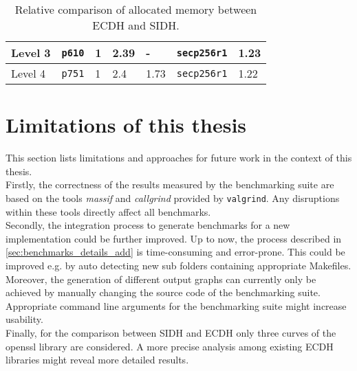 \begin{table}[H]
\begin{tabular}{|K{1.8cm}|K{1.8cm}|K{1.8cm}|K{2cm}|K{1.8cm}|K{1.8cm}|K{1.8cm}|}
{}Level 3                                                                                                                                                 & {}\texttt{p610}                                                                    & {}1 & 2.39                                                                                                         & -               & {}\texttt{secp256r1}                                                               & 1.23               \\ 
\hline
{}Level 4                                                                                                                                                 & {}\texttt{p751}                                                                    & {}1 & 2.4                                                                                                          & 1.73            & {}\texttt{secp256r1}                                                               & 1.22               \\
\hline
\end{tabular}
\caption[Comparing allocated memory between \gls{ECDH} and \gls{SIDH}]{Relative comparison of allocated memory between \gls{ECDH} and \gls{SIDH}.}
\label{tab:conclusion_ecdh_sidh_mem}
\end{table}

\section{Limitations of this thesis}\label{sec:conclusion_limits}

This section lists limitations and approaches for future work in the context of this thesis.
\\
Firstly, the correctness of the results measured by the benchmarking suite are based on the tools \textit{massif} and \textit{callgrind} provided by \texttt{valgrind}. Any disruptions within these tools directly affect all benchmarks.
\\
Secondly, the integration process to generate benchmarks for a new implementation could be further improved. Up to now, the process described in \ref{sec:benchmarks_details_add} is time-consuming and error-prone. This could be improved e.g. by auto detecting new sub folders containing appropriate Makefiles. Moreover, the generation of different output graphs can currently only be achieved by manually changing the source code of the benchmarking suite. Appropriate command line arguments for the benchmarking suite might increase usability.
\\
Finally, for the comparison between \gls{SIDH} and \gls{ECDH} only three curves of the  \gls{openssl} library are considered. A more precise analysis among existing \gls{ECDH} libraries might reveal more detailed results.